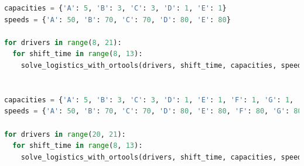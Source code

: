 \documentclass[12pt,a4paper,final]{article}
\begin{document}
\begin{lstlisting}[language=Python, label={lst:codigo}]
capacities = {'A': 5, 'B': 3, 'C': 3, 'D': 1, 'E': 1}
speeds = {'A': 50, 'B': 70, 'C': 70, 'D': 80, 'E': 80}

for drivers in range(8, 21):
  for shift_time in range(8, 13):
    solve_logistics_with_ortools(drivers, shift_time, capacities, speeds)


capacities = {'A': 5, 'B': 3, 'C': 3, 'D': 1, 'E': 1, 'F': 1, 'G': 1, 'H': 1, 'I': 1}
speeds = {'A': 50, 'B': 70, 'C': 70, 'D': 80, 'E': 80, 'F': 80, 'G': 80, 'H': 80, 'I': 80}

for drivers in range(20, 21):
  for shift_time in range(8, 13):
    solve_logistics_with_ortools(drivers, shift_time, capacities, speeds)
    \end{lstlisting}
\end{document}

